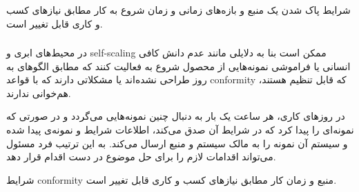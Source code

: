 شرایط پاک شدن یک منبع و بازه‌های زمانی و زمان شروع به کار  مطابق نیاز‌های کسب و کاری قابل تغییر است.
\cite{janitor-monkey}

\subsubsection{}
در محیط‌های ابری و ‌self-scaling ممکن است بنا به دلایلی مانند عدم دانش کافی انسانی یا فراموشی نمونه‌هایی از محصول شروع به فعالیت کنند که مطابق الگو‌های به روز طراحی نشده‌اند یا مشکلاتی دارند که با قواعد conformity که قابل تنظیم هستند، هم‌خوانی ندارند.

در روز‌های کاری، هر ساعت یک بار به دنبال چنین نمونه‌هایی می‌گردد و در صورتی که نمونه‌ای را پیدا کرد که در شرایط آن صدق می‌کند، اطلاعات شرایط و نمونه‌ی پیدا شده و سیستم آن نمونه را به مالک سیستم و منبع ارسال می‌کند. به این ترتیب فرد مسئول می‌تواند اقدامات لازم را برای حل موضوع در دست اقدام قرار دهد.

شرایط conformity منبع و زمان کار  مطابق نیاز‌های کسب و کاری قابل تغییر است.
\cite{conformity-monkey}

